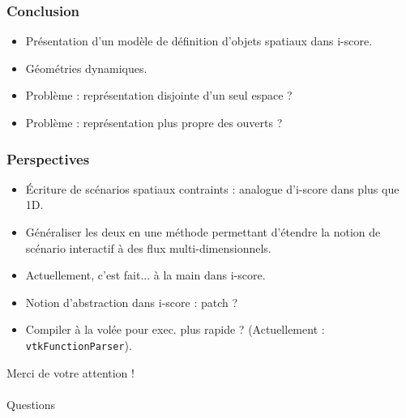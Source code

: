 \documentclass{beamer}
\begin{document}
\begin{frame}
    \frametitle{Conclusion}
    \Large
    \begin{itemize}
        \item Présentation d'un modèle de définition d'objets spatiaux dans i-score.
        \item Géométries dynamiques.
        \item Problème : représentation disjointe d'un seul espace ? 
        \item Problème : représentation plus propre des ouverts ?
    \end{itemize}
\end{frame}
\begin{frame}
    \frametitle{Perspectives}
    \Large
    \begin{itemize}
        \item Écriture de scénarios spatiaux contraints : analogue d'i-score dans plus que 1D.
        \item Généraliser les deux en une méthode permettant d'étendre la notion de scénario interactif à des flux multi-dimensionnels.
        \item Actuellement, c'est fait... à la main dans i-score.
        \item Notion d'abstraction dans i-score : patch ?
        \item Compiler à la volée pour exec. plus rapide ? (Actuellement : \texttt{vtkFunctionParser}).
    \end{itemize}
\end{frame}


\begin{frame}
    \large{}
    \centering
    Merci de votre attention !~\\
    
    \Huge{}~\\
    Questions
\end{frame}
\end{document}
